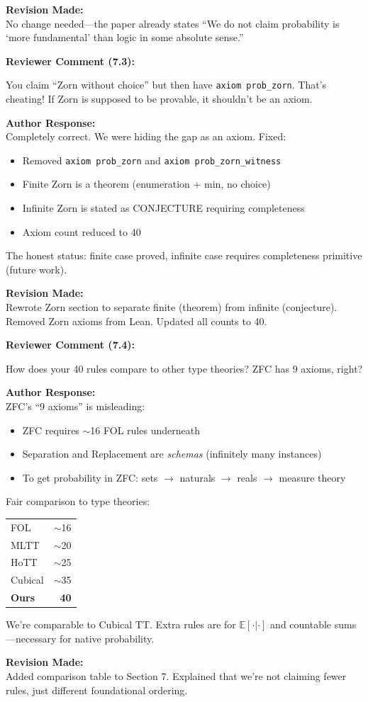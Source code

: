 \documentclass[11pt,a4paper]{article}
\newenvironment{review}[1]{%
    \begin{leftbar}
    \textcolor{reviewcolor}{\textbf{Reviewer Comment (#1):}}\\[0.5em]
    \itshape
}{%
    \end{leftbar}
}
\newenvironment{response}{%
    \textcolor{responsecolor}{\textbf{Author Response:}}\\[0.5em]
}{%
    \vspace{1em}
}
\newenvironment{revision}{%
    \textcolor{revisioncolor}{\textbf{Revision Made:}}\\[0.5em]
}{%
    \vspace{1em}
}
\begin{document}
\begin{revision}
No change needed---the paper already states ``We do not claim probability is `more fundamental' than logic in some absolute sense.''
\end{revision}

\begin{review}{7.3}
You claim ``Zorn without choice'' but then have \texttt{axiom prob\_zorn}. That's cheating! If Zorn is supposed to be provable, it shouldn't be an axiom.
\end{review}

\begin{response}
Completely correct. We were hiding the gap as an axiom. Fixed:
\begin{itemize}
    \item Removed \texttt{axiom prob\_zorn} and \texttt{axiom prob\_zorn\_witness}
    \item Finite Zorn is a theorem (enumeration + min, no choice)
    \item Infinite Zorn is stated as CONJECTURE requiring completeness
    \item Axiom count reduced to 40
\end{itemize}

The honest status: finite case proved, infinite case requires completeness primitive (future work).
\end{response}

\begin{revision}
Rewrote Zorn section to separate finite (theorem) from infinite (conjecture). Removed Zorn axioms from Lean. Updated all counts to 40.
\end{revision}

\begin{review}{7.4}
How does your 40 rules compare to other type theories? ZFC has 9 axioms, right?
\end{review}

\begin{response}
ZFC's ``9 axioms'' is misleading:
\begin{itemize}
    \item ZFC requires $\sim$16 FOL rules underneath
    \item Separation and Replacement are \emph{schemas} (infinitely many instances)
    \item To get probability in ZFC: sets $\to$ naturals $\to$ reals $\to$ measure theory
\end{itemize}

Fair comparison to type theories:
\begin{center}
\begin{tabular}{lr}
FOL & $\sim$16 \\
MLTT & $\sim$20 \\
HoTT & $\sim$25 \\
Cubical & $\sim$35 \\
\textbf{Ours} & \textbf{40}
\end{tabular}
\end{center}

We're comparable to Cubical TT. Extra rules are for $\mathbb{E}[\cdot|\cdot]$ and countable sums---necessary for native probability.
\end{response}

\begin{revision}
Added comparison table to Section 7. Explained that we're not claiming fewer rules, just different foundational ordering.
\end{revision}
\end{document}
